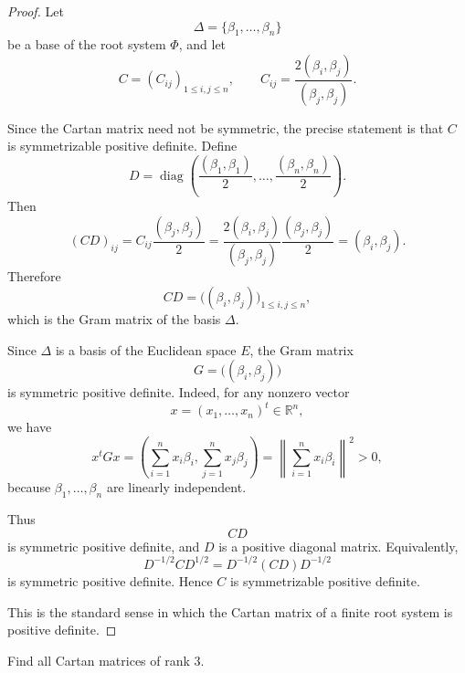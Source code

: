 \begin{proof}
    Let
    \[
        \Delta=\{\beta_1,\ldots,\beta_n\}
    \]
    be a base of the root system \(\Phi\), and let
    \[
        C=(C_{ij})_{1\leq i,j\leq n},
        \qquad
        C_{ij}=\frac{2(\beta_i,\beta_j)}{(\beta_j,\beta_j)}.
    \]
    
    Since the Cartan matrix need not be symmetric, the precise statement is that
    \(C\) is symmetrizable positive definite. Define
    \[
        D=\operatorname{diag}
        \left(
            \frac{(\beta_1,\beta_1)}{2},
            \ldots,
            \frac{(\beta_n,\beta_n)}{2}
        \right).
    \]
    Then
    \[
        (CD)_{ij}
        =
        C_{ij}\frac{(\beta_j,\beta_j)}{2}
        =
        \frac{2(\beta_i,\beta_j)}{(\beta_j,\beta_j)}
        \frac{(\beta_j,\beta_j)}{2}
        =
        (\beta_i,\beta_j).
    \]
    Therefore
    \[
        CD=
        \bigl((\beta_i,\beta_j)\bigr)_{1\leq i,j\leq n},
    \]
    which is the Gram matrix of the basis \(\Delta\).
    
    Since \(\Delta\) is a basis of the Euclidean space \(E\), the Gram matrix
    \[
        G=\bigl((\beta_i,\beta_j)\bigr)
    \]
    is symmetric positive definite. Indeed, for any nonzero vector
    \[
        x=(x_1,\ldots,x_n)^t\in\mathbb R^n,
    \]
    we have
    \[
        x^tGx
        =
        \left(
            \sum_{i=1}^n x_i\beta_i,
            \sum_{j=1}^n x_j\beta_j
        \right)
        =
        \left\|
            \sum_{i=1}^n x_i\beta_i
        \right\|^2
        >0,
    \]
    because \(\beta_1,\ldots,\beta_n\) are linearly independent.
    
    Thus
    \[
        CD
    \]
    is symmetric positive definite, and \(D\) is a positive diagonal matrix.
    Equivalently,
    \[
        D^{-1/2}CD^{1/2}
        =
        D^{-1/2}(CD)D^{-1/2}
    \]
    is symmetric positive definite. Hence \(C\) is symmetrizable positive definite.
    
    This is the standard sense in which the Cartan matrix of a finite root system
    is positive definite.
    \end{proof}

\begin{exercise}
    Find all Cartan matrices of rank \(3\).
\end{exercise}

